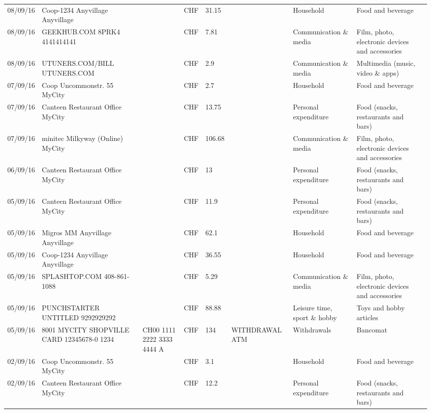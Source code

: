 \begin{landscape}
\begin{tiny}
\begin{longtable}{lp{4cm}llllp{3cm}ll}
		    08/09/16 & Coop-1234 Anyvillage    Anyvillage &       & CHF   & 31.15 &       & Household & Food and beverage \\
		    08/09/16 & GEEKHUB.COM  8PRK4        4141414141 &       & CHF   & 7.81  &       & Communication \& media & Film, photo, electronic devices and accessories \\
		    08/09/16 & UTUNERS.COM/BILL          UTUNERS.COM &       & CHF   & 2.9   &       & Communication \& media & Multimedia (music, video \& apps) \\
		    07/09/16 & Coop Uncommonstr. 55   MyCity &       & CHF   & 2.7   &       & Household & Food and beverage \\
		    07/09/16 & Canteen Restaurant Office      MyCity &       & CHF   & 13.75 &       & Personal expenditure & Food (snacks, restaurants and bars) \\
		    07/09/16 & minitec Milkyway (Online) MyCity &       & CHF   & 106.68 &       & Communication \& media & Film, photo, electronic devices and accessories \\
		    06/09/16 & Canteen Restaurant Office      MyCity &       & CHF   & 13    &       & Personal expenditure & Food (snacks, restaurants and bars) \\
		    05/09/16 & Canteen Restaurant Office      MyCity &       & CHF   & 11.9  &       & Personal expenditure & Food (snacks, restaurants and bars) \\
		    05/09/16 & Migros MM Anyvillage    Anyvillage &       & CHF   & 62.1  &       & Household & Food and beverage \\
		    05/09/16 & Coop-1234 Anyvillage    Anyvillage &       & CHF   & 36.55 &       & Household & Food and beverage \\
		    05/09/16 & SPLASHTOP.COM            408-861-1088 &       & CHF   & 5.29  &       & Communication \& media & Film, photo, electronic devices and accessories \\
		    05/09/16 & PUNCHSTARTER UNTITLED     9292929292 &       & CHF   & 88.88 &       & Leisure time, sport \& hobby & Toys and hobby articles \\
		    05/09/16 & 8001 MYCITY SHOPVILLE CARD 12345678-0 1234 & CH00 1111 2222 3333 4444 A & CHF   & 134   & WITHDRAWAL ATM & Withdrawals & Bancomat \\
		    02/09/16 & Coop Uncommonstr. 55   MyCity &       & CHF   & 3.1   &       & Household & Food and beverage \\
		    02/09/16 & Canteen Restaurant Office      MyCity &       & CHF   & 12.2  &       & Personal expenditure & Food (snacks, restaurants and bars) \\

\end{longtable}
\end{tiny}
\end{landscape}
